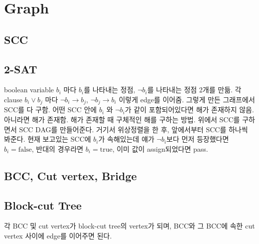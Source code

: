\documentclass[9pt,landscape,a4paper,twocolumn]{extarticle}
\begin{document}
\section{Graph}

\subsection{SCC}


\subsection{2-SAT}
boolean variable $b_{i}$ 마다 $b_{i}$를 나타내는 정점, $\neg b_{i} $를 나타내는 정점 2개를 만듦. 각 clause $b_{i} \lor b_{j}$ 마다 $\neg b_{i} \to b_{j}$, $\neg b_{j} \to b_{i}$ 이렇게 edge를 이어줌. 그렇게 만든 그래프에서 SCC를 다 구함. 어떤 SCC 안에 $b_{i}$ 와 $\neg b_{i}$가 같이 포함되어있다면 해가 존재하지 않음. 아니라면 해가 존재함. 해가 존재할 때 구체적인 해를 구하는 방법. 위에서 SCC를 구하면서 SCC DAG를 만들어준다. 거기서 위상정렬을 한 후, 앞에서부터 SCC를 하나씩 봐준다. 현재 보고있는 SCC에 $b_{i}$가 속해있는데 얘가 $\neg b_{i}$보다 먼저 등장했다면 $b_{i} = \mathrm{false}$, 반대의 경우라면 $b_{i} = \mathrm{true}$, 이미 값이 assign되었다면 pass.

\subsection{BCC, Cut vertex, Bridge}


\subsection{Block-cut Tree}

각 BCC 및 cut vertex가 block-cut tree의 vertex가 되며, BCC와 그 BCC에 속한 cut vertex 사이에 edge를 이어주면 된다.

% 

% 
\end{document}
